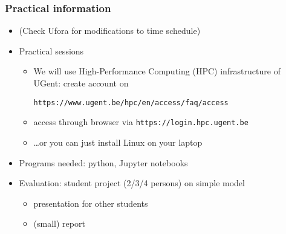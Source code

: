 \documentclass[aspectratio=43,9pt]{beamer}
\begin{document}
\begin{frame}
	\frametitle{Practical information}
	\begin{itemize}
		\item (Check Ufora for modifications to time schedule)\vspace*{2ex}
		\item Practical sessions\vspace*{1ex}
			\begin{itemize}
				\item We will use High-Performance Computing (HPC) infrastructure of UGent: create account on\vspace*{1ex}
					\par
					\texttt{https://www.ugent.be/hpc/en/access/faq/access}\vspace*{1ex}
				\item access through browser via \texttt{https://login.hpc.ugent.be}\vspace*{1ex}
				\item \ldots or you can just install Linux on your laptop\vspace*{2ex}
			\end{itemize}
		\item Programs needed: python, Jupyter notebooks\vspace*{2ex}
		\item Evaluation: student project (2/3/4 persons) on simple model\vspace*{1ex}
			\begin{itemize}
				\item presentation for other students\vspace*{1ex}
				\item (small) report
			\end{itemize}
	\end{itemize}
\end{frame}
%
%
\begin{frame}
	\begin{center}
	\end{center}
\end{frame}
%
%
\end{document}
